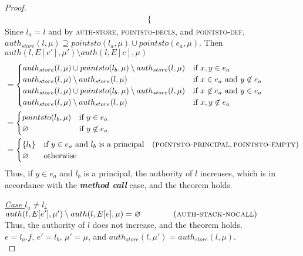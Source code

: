 \documentclass{llncs}
\begin{document}
\begin{proof}
\begin{align*}
\begin{cases}
\end{cases}
\end{align*}
Since $l_a = l$ and by \textsc{auth-store}, \textsc{pointsto-decls}, and \textsc{pointsto-def}, $auth_{store}(l, \mu) \supseteq pointsto(l_a, \mu) \cup pointsto(e_a, \mu)$. Then $auth(l, E[e'], \mu') \setminus auth(l, E[e], \mu)$
\begin{align*}
&=
\begin{cases}
    auth_{store}(l, \mu) \cup pointsto(l_b, \mu) \setminus auth_{store}(l, \mu) & \text{if } x, y \in e_a\\
    auth_{store}(l, \mu) \setminus auth_{store}(l, \mu) & \text{if } x \in e_a\text{ and } y \not\in e_a\\
    auth_{store}(l, \mu) \cup pointsto(l_b, \mu) \setminus auth_{store}(l, \mu) & \text{if } x \not\in e_a \text{ and } y \in e_a\\
    auth_{store}(l, \mu) \setminus auth_{store}(l, \mu) & \text{if } x, y \not\in e_a
\end{cases}\\
&=
\begin{cases}
    pointsto(l_b, \mu) & \text{if } y \in e_a\\
    \varnothing & \text{if } y \not\in e_a\\
\end{cases}\\
&=
\begin{cases}
    \{ l_b \} & \text{if } y \in e_a \text{ and } l_b \text { is a principal}~~~(\textsc{pointsto-principal}, \textsc{pointsto-empty})\\
    \varnothing & \text{otherwise}\\
\end{cases}
\end{align*}
Thus, if $y \in e_a$ and $l_b$ is a principal, the authority of $l$ increases, which is in accordance with the \textbf{\textit{method call}} case, and the theorem holds.

\noindent\underline{\textit{Case $l_a \neq l$:}} $auth(l, E[e'], \mu') \setminus auth(l, E[e], \mu) = \varnothing~~~~~~~~~~~~(\textsc{auth-stack-nocall})$\\
Thus, the authority of $l$ does not increase, and the theorem holds.\\


\noindent{}
$e = l_a.f$, $e' = l_b$, $\mu' = \mu$, and $auth_{store}(l, \mu') = auth_{store}(l, \mu)$.\\


\end{proof}
\end{document}
